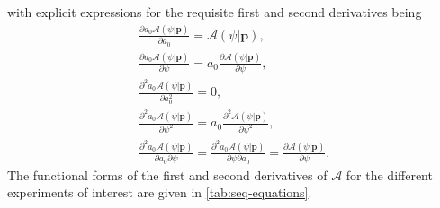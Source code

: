 with explicit expressions for the requisite first and second derivatives being
\begin{subequations}
    \begin{gather}
        \frac{\partial a_0 \mathcal{A} (\psi | \symbf{p})}{\partial a_0} =
            \mathcal{A} (\psi | \symbf{p}),\\
        \frac{\partial a_0 \mathcal{A} (\psi | \symbf{p})}{\partial \psi} =
            a_0 \frac{\partial \mathcal{A} (\psi | \symbf{p})}{\partial \psi},\\
        \frac{\partial^2 a_0 \mathcal{A} (\psi | \symbf{p})}{\partial a_0^2} = 0,\\
        \frac{\partial^2 a_0 \mathcal{A} (\psi | \symbf{p})}{\partial \psi^2} =
            a_0 \frac{\partial^2 \mathcal{A} (\psi | \symbf{p})}{\partial \psi^2},\\
        \frac{\partial^2 a_0 \mathcal{A} (\psi | \symbf{p})}{\partial a_0 \partial \psi} =
            \frac{\partial^2 a_0 \mathcal{A} (\psi | \symbf{p})}{\partial \psi \partial a_0} =
            \frac{\partial \mathcal{A} (\psi | \symbf{p})}{\partial \psi}.
    \end{gather}
\end{subequations}
The functional forms of the first and second derivatives of $\mathcal{A}$ for
the different experiments of interest are given in \cref{tab:seq-equations}.

